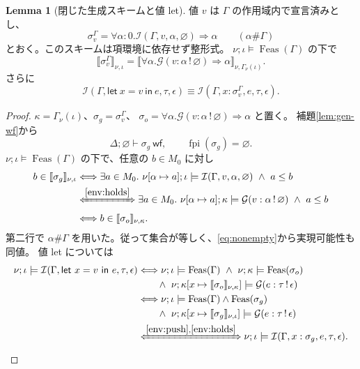 \documentclass[a4paper,11pt]{article}
\theoremstyle{definition}
\newtheorem{lemma}[definition]{Lemma}
\newcommand{\FPI}{\operatorname{fpi}}
\newcommand{\emp}{\varnothing}
\newcommand{\den}[1]{\llbracket #1\rrbracket}
\newcommand{\gen}[3]{\mathcal G(#1:#2\,!\,#3)}
\newcommand{\infers}[4]{\mathcal I(#1,#2,#3,#4)}
\newcommand{\lete}[3]{\mathsf{let}\ #1=#2\ \mathsf{in}\ #3}
\newcommand{\Feas}{\operatorname{Feas}}
\newcommand{\proofspace}{\Needspace{16\baselineskip}}
\begin{document}
\proofspace
\begin{samepage}
\begin{lemma}[閉じた生成スキームと値 let]\label{lem:generated}
値 $v$ は $\Gamma$ の作用域内で宣言済みとし、
\[
 \sigma_v^\Gamma=\forall\alpha:0.
       \infers\Gamma v\alpha\emp\Rightarrow\alpha
 \qquad(\alpha\#\Gamma)
\]
とおく。このスキームは項環境に依存せず整形式。
$\nu;\iota\models\Feas(\Gamma)$ の下で
\[
 \den{\sigma_v^\Gamma}_{\nu,\iota}
 =\den{\forall\alpha.\gen v\alpha\emp\Rightarrow\alpha}_{\nu,\Gamma_\nu(\iota)}.
\]
さらに
\begin{equation}\label{eq:valuelet}
 \infers\Gamma{\lete x v e}\tau\epsilon
 \equiv\infers{\Gamma,x:\sigma_v^\Gamma}e\tau\epsilon.
\end{equation}
\end{lemma}
\end{samepage}
\nopagebreak[4]
\begin{proof}\leavevmode\label{proof:lem:generated}
$\kappa=\Gamma_\nu(\iota)$、$\sigma_g=\sigma_v^\Gamma$、
$\sigma_o=\forall\alpha.\gen v\alpha\emp\Rightarrow\alpha$ と置く。
補題\ref{lem:gen-wf}から
\[
 \Delta;\emp\vdash\sigma_g\ \mathsf{wf},\qquad\FPI(\sigma_g)=\emp.
\]
$\nu;\iota\models\Feas(\Gamma)$ の下で、任意の $b\in M_0$ に対し
\begin{align*}
 b\in\den{\sigma_g}_{\nu,\iota}
 &\Longleftrightarrow\exists a\in M_0.\
     \nu[\alpha\mapsto a];\iota\models\infers\Gamma v\alpha\emp\ \land\ a\leq b\\
 &\xLeftrightarrow{\eqref{env:holds}}\exists a\in M_0.\
     \nu[\alpha\mapsto a];\kappa\models\gen v\alpha\emp\ \land\ a\leq b\\
 &\Longleftrightarrow b\in\den{\sigma_o}_{\nu,\kappa}.
\end{align*}
第二行で $\alpha\#\Gamma$ を用いた。従って集合が等しく、\eqref{eq:nonempty}から実現可能性も同値。
値 let については
\begin{align*}
 \nu;\iota\models\infers\Gamma{\lete x v e}\tau\epsilon
 &\Longleftrightarrow\nu;\iota\models\Feas(\Gamma)\ \land\
   \nu;\kappa\models\Feas(\sigma_o)\\
 &\hspace{2em}\land\ \nu;\kappa[x\mapsto\den{\sigma_o}_{\nu,\kappa}]\models\gen e\tau\epsilon\\
 &\Longleftrightarrow\nu;\iota\models\Feas(\Gamma)\land\Feas(\sigma_g)\\
 &\hspace{2em}\land\ \nu;\kappa[x\mapsto\den{\sigma_g}_{\nu,\iota}]\models\gen e\tau\epsilon\\
 &\xLeftrightarrow{\eqref{env:push},\eqref{env:holds}}
   \nu;\iota\models\infers{\Gamma,x:\sigma_g}e\tau\epsilon.
\end{align*}
\end{proof}
\end{document}
